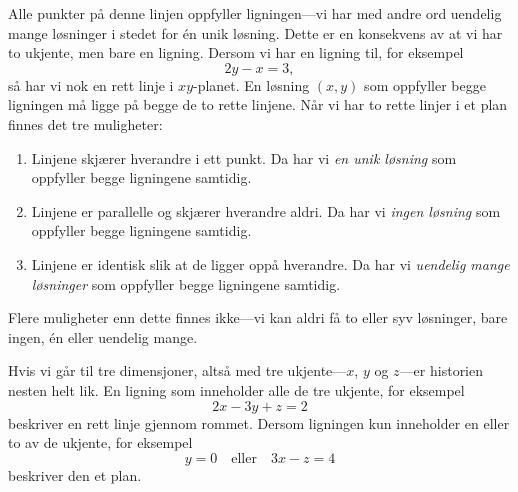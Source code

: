 \documentclass[a4paper,norsk,12pt]{article}
\begin{document}
Alle punkter på denne linjen oppfyller ligningen---vi har med andre ord uendelig mange løsninger i stedet for \'en unik løsning. Dette er en konsekvens av at vi har to ukjente, men bare en ligning. Dersom vi har en ligning til, for eksempel
\begin{displaymath}
	2y - x = 3,
\end{displaymath}
så har vi nok en rett linje i $xy$-planet. En løsning $(x,y)$ som oppfyller begge ligningen må ligge på begge de to rette linjene. Når vi har to rette linjer i et plan finnes det tre muligheter:
\begin{enumerate}
	\item Linjene skjærer hverandre i ett punkt. Da har vi \emph{en unik løsning} som oppfyller begge ligningene samtidig.
	\item Linjene er parallelle og skjærer hverandre aldri. Da har vi \emph{ingen løsning} som oppfyller begge ligningene samtidig.
	\item Linjene er identisk slik at de ligger oppå hverandre. Da har vi \emph{uendelig mange løsninger} som oppfyller begge ligningene samtidig. 
\end{enumerate}
Flere muligheter enn dette finnes ikke---vi kan aldri få to eller syv løsninger, bare ingen, \'en eller uendelig mange.

Hvis vi går til tre dimensjoner, altså med tre ukjente---$x$, $y$ og $z$---er historien nesten helt lik. En ligning som inneholder alle de tre ukjente, for eksempel
\begin{displaymath}
	2x - 3y + z = 2
\end{displaymath}
beskriver en rett linje gjennom rommet. Dersom ligningen kun inneholder en eller to av de ukjente, for eksempel
\begin{displaymath}
	y = 0\quad\text{eller}\quad 3x-z = 4
\end{displaymath}
beskriver den et plan. 
\end{document}
